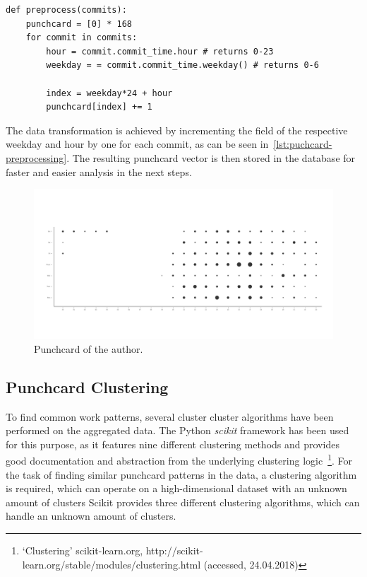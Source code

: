 \begin{verbatim}
def preprocess(commits):
    punchcard = [0] * 168
    for commit in commits:
        hour = commit.commit_time.hour # returns 0-23
        weekday = = commit.commit_time.weekday() # returns 0-6

        index = weekday*24 + hour
        punchcard[index] += 1

\end{verbatim}
\begingroup
{}\label{lst:puchcard-preprocessing}
\endgroup

The data transformation is achieved by incrementing the field of the respective weekday and hour by one for each commit, as can be seen in~\ref{lst:puchcard-preprocessing}.
The resulting punchcard vector is then stored in the database for faster and easier analysis in the next steps.

\begin{figure}[H]
    \includegraphics[scale=0.32]{./graphs/analysis/ordered-punchcard}
    \centering
    \caption{Punchcard of the author.}\label{fig:working-hour-rhythm-author}
\end{figure}



\subsection{Punchcard Clustering}

To find common work patterns, several cluster cluster algorithms have been performed on the aggregated data.
The Python \emph{scikit} framework has been used for this purpose, as it features nine different clustering methods and provides good documentation and abstraction from the underlying clustering logic~\footnote{`Clustering' scikit-learn.org, http://scikit-learn.org/stable/modules/clustering.html (accessed, 24.04.2018)}.
For the task of finding similar punchcard patterns in the data, a clustering algorithm is required, which can operate on a high-dimensional dataset with an unknown amount of clusters
Scikit provides three different clustering algorithms, which can handle an unknown amount of clusters.

